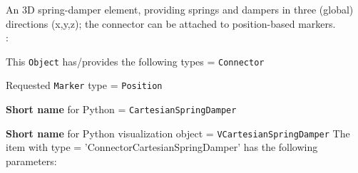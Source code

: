 \ei

%
\newpage


\label{sec:item:ObjectConnectorCartesianSpringDamper}
An 3D spring-damper element, providing springs and dampers in three (global) directions (x,y,z); the connector can be attached to position-based markers.
\vspace{12pt}\\

\noindent {}:
\bi
  \item This \texttt{Object} has/provides the following types = \texttt{Connector}
  \item Requested \texttt{Marker} type = \texttt{Position}
  \item {\bf Short name} for Python = \texttt{CartesianSpringDamper}
  \item {\bf Short name} for Python visualization object = \texttt{VCartesianSpringDamper}
\ei\vspace{12pt} \noindent 
The item  with type = 'ConnectorCartesianSpringDamper' has the following parameters:
\vspace{-0.5cm}\\
\vspace{-0.5cm}\\
